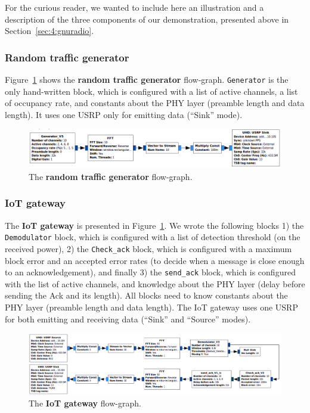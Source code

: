 For the curious reader, we wanted to include here an illustration and a description of the three components of our demonstration, presented above in Section~\ref{sec:4:gnuradio}.

\subsubsection*{Random traffic generator}

Figure~\ref{fig:4app:USRP_TX_PU__v1__simple_grc} shows the \textbf{random traffic generator} flow-graph.
\texttt{Generator} is the only hand-written block, which is configured with a list of active channels, a list of occupancy rate, and constants about the PHY layer (preamble length and data length). It uses one USRP only for emitting data (``Sink'' mode).

\begin{figure}[!h]
	\centering
    \includegraphics[width=1.00\textwidth]{2-Chapters/4-Chapter/Images/USRP_TX_PU__v1__simple_grc.png}
    \caption{The \textbf{random traffic generator} flow-graph.}
    \label{fig:4app:USRP_TX_PU__v1__simple_grc}
\end{figure}


\subsubsection*{IoT gateway}

The \textbf{IoT gateway} is presented in Figure~\ref{fig:4app:USRP_TX_PU__v1__simple_grc}.
%
We wrote the following blocks
1) the \texttt{Demodulator} block, which is configured with a list of detection threshold (on the received power),
2) the \texttt{Check\_ack} block, which is configured with a maximum block error and an accepted error rates (to decide when a message is close enough to an acknowledgement), 
and finally 3) the \texttt{send\_ack} block, which is configured with the list of active channels, and knowledge about the PHY layer (delay before sending the Ack and its length). All blocks need to know constants about the PHY layer (preamble length and data length). The IoT gateway uses one USRP for both emitting and receiving data (``Sink'' and ``Source'' modes).

\begin{figure}[!h]
	\centering
    \includegraphics[width=1.00\textwidth]{2-Chapters/4-Chapter/Images/USRP_RX_BTS__v1__simple_grc.png}
    \caption{The \textbf{IoT gateway} flow-graph.}
    \label{fig:4app:USRP_RX_BTS__v1__simple_grc}
\end{figure}


